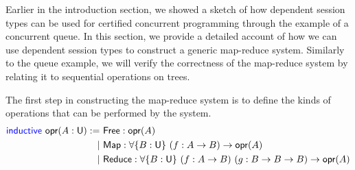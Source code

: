 Earlier in the introduction section, we showed a sketch of how dependent session types
can be used for certified concurrent programming through the example of a concurrent queue.
In this section, we provide a detailed account of how we can use dependent session types
to construct a generic map-reduce system. Similarly to the queue example, we will verify
the correctness of the map-reduce system by relating it to sequential operations on trees.

\begin{figure}[H]
\end{figure}

The first step in constructing the map-reduce system is to define the kinds of operations
that can be performed by the system.
\begingroup
\small
\addtolength{\jot}{-0.2em}
\begin{align*}
  \textsf{\color{blue}inductive}\ \textsf{opr}(A : \textsf{U}) :=\ &\textsf{Free}  : \textsf{opr}(A) \\
  \mid\ &\textsf{Map}   : \forall \{B : \textsf{U}\}\ (f : A \rightarrow B) \rightarrow \textsf{opr}(A) \\
  \mid\ &\textsf{Reduce}: \forall \{B : \textsf{U}\}\ (f : A \rightarrow B)\ (g : B \rightarrow B \rightarrow B) \rightarrow \textsf{opr}(A)
\end{align*}
\endgroup

